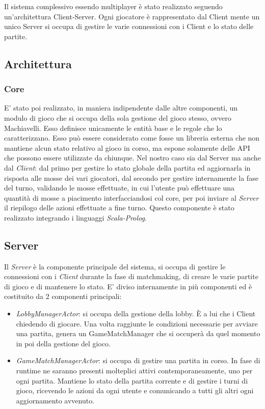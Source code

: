   Il sistema complessivo essendo multiplayer è stato realizzato seguendo un’architettura Client-Server.
  Ogni giocatore è rappresentato dal Client mente un unico Server si occupa di gestire le varie connessioni con i Client e lo stato delle partite.

  \subsection[Architettura]{Architettura}
  \subsubsection{Core}
  E’ stato poi realizzato, in maniera indipendente dalle altre componenti, un modulo di gioco che si occupa della sola gestione del gioco stesso, ovvero Machiavelli.
  Esso definisce unicamente le entità base e le regole che lo caratterizzano.
  Esso può essere considerato come fosse un libreria esterna che non mantiene alcun stato relativo al gioco in corso, ma espone solamente delle API che possono essere utilizzate da chiunque.
  Nel nostro caso sia dal Server ma anche dal \textit{Client}: dal primo per gestire lo stato globale della partita ed aggiornarla in risposta alle mosse dei vari giocatori, dal secondo per gestire internamente la fase del turno, validando le mosse effettuate, in cui l’utente può effettuare una quantità di mosse a piacimento interfacciandosi col core, per poi inviare al \textit{Server} il riepilogo delle azioni effettuate a fine turno.
  Questo componente è stato realizzato integrando i linguaggi \textit{Scala-Prolog}.

  \subsection{Server}
  Il \textit{Server} è la componente principale del sistema, si occupa di gestire le connessioni con i \textit{Client} durante la fase di matchmaking, di creare le varie partite di gioco e di mantenere lo stato.
  E’ diviso internamente in più componenti ed è costituito da 2 componenti principali:
  \begin{itemize}
    \item \textit{LobbyManagerActor}: si occupa della gestione della lobby.
    È a lui che i Client chiedendo di giocare.
    Una volta raggiunte le condizioni necessarie per avviare una partita, genera un GameMatchManager che si occuperà da quel momento in poi della gestione del gioco.
    \item \textit{GameMatchManagerActor}: si occupa di gestire una partita in corso.
    In fase di runtime ne saranno presenti molteplici attivi contemporaneamente, uno per ogni partita.
    Mantiene lo stato della partita corrente e di gestire i turni di gioco, ricevendo le azioni da ogni utente e comunicando a tutti gli altri ogni aggiornamento avvenuto.
  \end{itemize}

